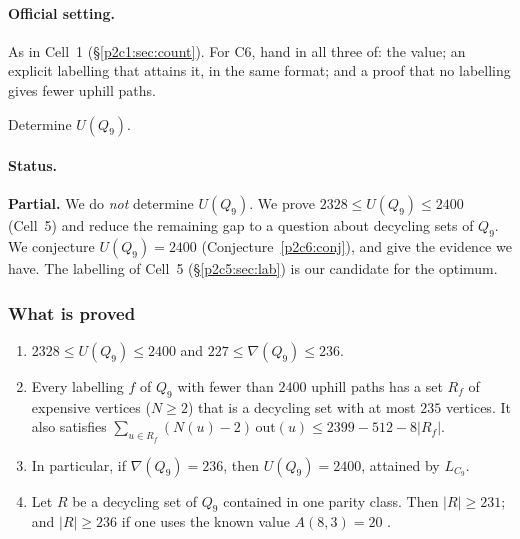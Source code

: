 
\paragraph{Official setting.} As in Cell~1 (\S\ref{p2c1:sec:count}). For C6, hand in all three
of: the value; an explicit labelling that attains it, in the same format; and a proof that no
labelling gives fewer uphill paths.

\begin{statement}
Determine $U(Q_9)$.
\end{statement}

\paragraph{Status.} \textbf{Partial.} We do \emph{not} determine $U(Q_9)$. We prove
$2328\le U(Q_9)\le2400$ (Cell~5) and reduce the remaining gap to a question about decycling sets
of $Q_9$. We conjecture $U(Q_9)=2400$ (Conjecture~\ref{p2c6:conj}), and give the evidence we have.
The labelling of Cell~5 (\S\ref{p2c5:sec:lab}) is our candidate for the optimum.

\subsubsection{What is proved}

\begin{proposition}\label{p2c6:prop:reduce}
\begin{enumerate}[label=(\alph*)]
\item $2328\le U(Q_9)\le2400$ and $227\le\nabla(Q_9)\le236$.
\item Every labelling $f$ of $Q_9$ with fewer than $2400$ uphill paths has a set $R_f$ of expensive
  vertices ($N\ge2$) that is a decycling set with at most $235$ vertices. It also satisfies
  $\sum_{u\in R_f}(N(u)-2)\,\mathrm{out}(u)\le2399-512-8|R_f|$.
\item In particular, if $\nabla(Q_9)=236$, then $U(Q_9)=2400$, attained by $L_{C_9}$.
\item Let $R$ be a decycling set of $Q_9$ contained in one parity class. Then $|R|\ge231$; and
  $|R|\ge236$ if one uses the known value $A(8,3)=20$ \cite{MS77}.
\end{enumerate}
\end{proposition}

